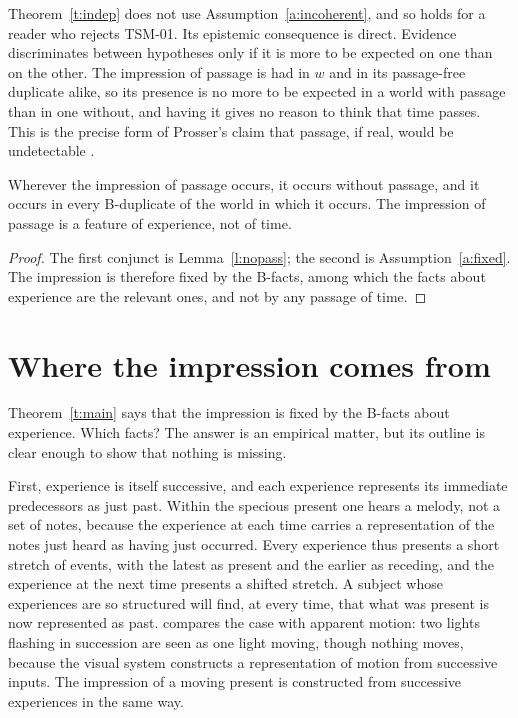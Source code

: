 \documentclass{situationist-preprint}
\begin{document}
Theorem~\ref{t:indep} does not use Assumption~\ref{a:incoherent}, and so holds for a reader who rejects TSM-01. Its epistemic consequence is direct. Evidence discriminates between hypotheses only if it is more to be expected on one than on the other. The impression of passage is had in $w$ and in its passage-free duplicate alike, so its presence is no more to be expected in a world with passage than in one without, and having it gives no reason to think that time passes. This is the precise form of Prosser's claim that passage, if real, would be undetectable \citep{Prosser2016}.

\begin{theorem}\label{t:main}
Wherever the impression of passage occurs, it occurs without passage, and it occurs in every B-duplicate of the world in which it occurs. The impression of passage is a feature of experience, not of time.
\end{theorem}

\begin{proof}
The first conjunct is Lemma~\ref{l:nopass}; the second is Assumption~\ref{a:fixed}. The impression is therefore fixed by the B-facts, among which the facts about experience are the relevant ones, and not by any passage of time.
\end{proof}

\section{Where the impression comes from}\label{s:source}

Theorem~\ref{t:main} says that the impression is fixed by the B-facts about experience. Which facts? The answer is an empirical matter, but its outline is clear enough to show that nothing is missing.

First, experience is itself successive, and each experience represents its immediate predecessors as just past. Within the specious present one hears a melody, not a set of notes, because the experience at each time carries a representation of the notes just heard as having just occurred. Every experience thus presents a short stretch of events, with the latest as present and the earlier as receding, and the experience at the next time presents a shifted stretch. A subject whose experiences are so structured will find, at every time, that what was present is now represented as past. \citet{Paul2010} compares the case with apparent motion: two lights flashing in succession are seen as one light moving, though nothing moves, because the visual system constructs a representation of motion from successive inputs. The impression of a moving present is constructed from successive experiences in the same way.
\end{document}
